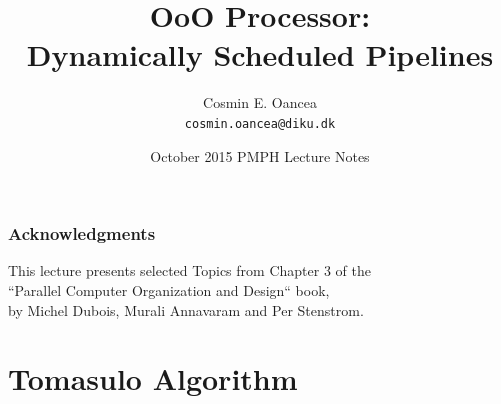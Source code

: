 \documentclass{beamer}
\title[OoO Processor]{OoO Processor:\\Dynamically Scheduled Pipelines}
\author[C.~Oancea]{Cosmin E. Oancea\\{\tt cosmin.oancea@diku.dk}}
\institute{Department of Computer Science (DIKU)\\University of Copenhagen}
\date[Oct 2015]{October 2015 PMPH Lecture Notes}
\begin{document}
\titleslide



\begin{frame}
\frametitle{Acknowledgments}
This lecture presents selected Topics from Chapter 3 of the\\
``Parallel Computer Organization and Design`` book,\\
by Michel Dubois, Murali Annavaram and Per Stenstrom.
\end{frame}

\begin{frame}[fragile]
	\tableofcontents
\end{frame}

\section{Tomasulo Algorithm}
\end{document}
